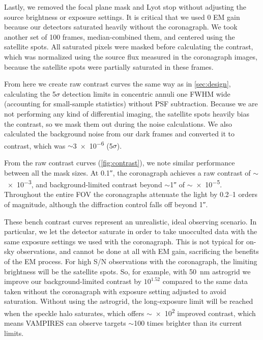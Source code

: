 \documentclass[]{spie}  %
\begin{document}
Lastly, we removed the focal plane mask and Lyot stop without adjusting the source brightness or exposure settings. It is critical that we used 0 EM gain because our detectors saturated heavily without the coronagraph. We took another set of 100 frames, median-combined them, and centered using the satellite spots. All saturated pixels were masked before calculating the contrast, which was normalized using the source flux measured in the coronagraph images, because the satellite spots were partially saturated in these frames.

From here we create raw contrast curves the same way as in \autoref{sec:design}, calculating the 5$\sigma$ detection limits in concentric annuli one FWHM wide (accounting for small-sample statistics\cite{mawet2014}) without PSF subtraction. Because we are not performing any kind of differential imaging, the satellite spots heavily bias the contrast, so we mask them out during the noise calculations. We also calculated the background noise from our dark frames and converted it to contrast, which was $\sim$\num{3e-6} (5$\sigma$).

From the raw contrast curves (\autoref{fig:contrast}), we note similar performance between all the mask sizes. At \ang{;;0.1}, the coronagraph achieves a raw contrast of $\sim$ \num{e-3}, and background-limited contrast beyond $\sim$\ang{;;1} of $\sim$\num{e-5}. Throughout the entire FOV the coronagraphs attenuate the light by \numrange{0.2}{1} orders of magnitude, although the diffraction control falls off beyond \ang{;;1}.

These bench contrast curves represent an unrealistic, ideal observing scenario. In particular, we let the detector saturate in order to take unocculted data with the same exposure settings we used with the coronagraph. This is not typical for on-sky observations, and cannot be done at all with EM gain, sacrificing the benefits of the EM process. For high S/N observations with the coronagraph, the limiting brightness will be the satellite spots. So, for example, with \qty{50}{\nano\meter} astrogrid we improve our background-limited contrast by $10^{1.52}$ compared to the same data taken without the coronagraph with exposure setting adjusted to avoid saturation. Without using the astrogrid, the long-exposure limit will be reached when the speckle halo saturates, which offers $\sim$\num{e2} improved contrast, which means VAMPIRES can observe targets $\sim$100 times brighter than its current limits.
\end{document}
